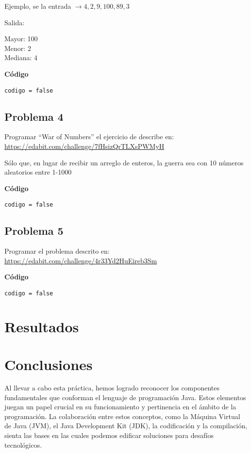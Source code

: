 \documentclass[12pt]{article}
\begin{document}
    Ejemplo, se la entrada $\longrightarrow 4 ,2, 9, 100, 89, 3$
    
    \hfil \break
    Salida:
    
    \hfil \break
    Mayor: 100 \\
    Menor: 2 \\
    Mediana: 4

    \hfil \break
    \textbf{Código}
    \begin{lstlisting}
codigo = false
    \end{lstlisting}

    \subsection*{Problema 4}
    Programar ``War of Numbers'' el ejercicio de describe en: \\
    \url{https://edabit.com/challenge/7fHsizQrTLXsPWMyH}

    Sólo que, en lugar de recibir un arreglo de enteros, la guerra sea con 10 números aleatorios entre 1-1000

    \hfil \break
    \textbf{Código}
    \begin{lstlisting}
codigo = false
    \end{lstlisting}

    \subsection*{Problema 5}
    Programar el problema descrito en: \\
    \url{https://edabit.com/challenge/4r33Yd2HuEireb3Sm}

    \hfil \break
    \textbf{Código}
    \begin{lstlisting}
codigo = false
    \end{lstlisting}

    \section*{Resultados}

    \section*{Conclusiones}
    Al llevar a cabo esta práctica, hemos logrado reconocer los componentes fundamentales que conforman el lenguaje de programación Java. Estos elementos juegan un papel crucial en su funcionamiento y pertinencia en el ámbito de la programación. La colaboración entre estos conceptos, como la Máquina Virtual de Java (JVM), el Java Development Kit (JDK), la codificación y la compilación, sienta las bases en las cuales podemos edificar soluciones para desafíos tecnológicos.
\end{document}
